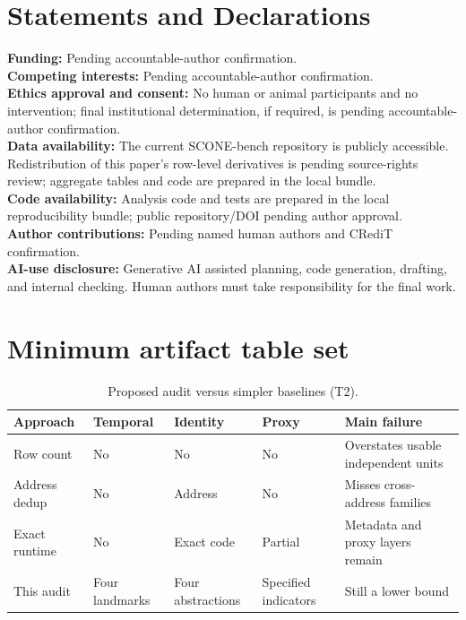 \documentclass[10pt]{article}
\newcommand{\dataset}{SCONE-bench}
\begin{document}
\section*{Statements and Declarations}
\textbf{Funding:} Pending accountable-author confirmation.\\
\textbf{Competing interests:} Pending accountable-author confirmation.\\
\textbf{Ethics approval and consent:} No human or animal participants and no intervention; final institutional determination, if required, is pending accountable-author confirmation.\\
\textbf{Data availability:} The current \dataset{} repository is publicly accessible. Redistribution of this paper's row-level derivatives is pending source-rights review; aggregate tables and code are prepared in the local bundle.\\
\textbf{Code availability:} Analysis code and tests are prepared in the local reproducibility bundle; public repository/DOI pending author approval.\\
\textbf{Author contributions:} Pending named human authors and CRediT confirmation.\\
\textbf{AI-use disclosure:} Generative AI assisted planning, code generation, drafting, and internal checking. Human authors must take responsibility for the final work.


{\small}

\clearpage
\appendix
\section{Minimum artifact table set}
\begin{table}[h]
\centering\footnotesize
\caption{Proposed audit versus simpler baselines (T2).}
\begin{tabularx}{\linewidth}{lXXXX}
\toprule Approach & Temporal & Identity & Proxy & Main failure \\
\midrule
Row count & No & No & No & Overstates usable independent units \\
Address dedup & No & Address & No & Misses cross-address families \\
Exact runtime & No & Exact code & Partial & Metadata and proxy layers remain \\
This audit & Four landmarks & Four abstractions & Specified indicators & Still a lower bound \\
\bottomrule
\end{tabularx}
\end{table}
\end{document}

